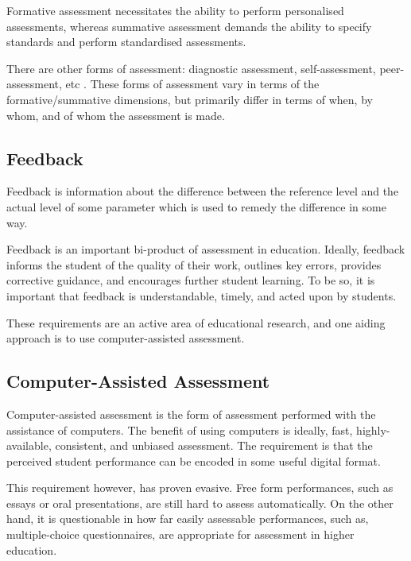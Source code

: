 Formative assessment necessitates the ability to perform personalised
assessments, whereas summative assessment demands the ability to specify
standards and perform standardised assessments.

There are other forms of assessment: diagnostic assessment, self-assessment,
peer-assessment, etc \cite{bull-mckenna-2004,topping-1998}.  These forms of
assessment vary in terms of the formative/summative dimensions, but primarily
differ in terms of when, by whom, and of whom the assessment is made.

\subsection{Feedback}

Feedback is information about the difference between the reference level and
the actual level of some parameter which is used to remedy the difference in
some way\cite{ramaprasad1989}.

Feedback is an important bi-product of assessment in
education\cite{black-william-1998}. Ideally, feedback informs the student of
the quality of their work, outlines key errors, provides corrective guidance,
and encourages further student learning. To be so, it is important that
feedback is understandable, timely, and acted upon by
students\cite{gibbs-simpson-2004}.

These requirements are an active area of educational research, and one aiding
approach is to use computer-assisted assessment.

\subsection{Computer-Assisted Assessment}

Computer-assisted assessment is the form of assessment performed with the
assistance of computers\cite{conole-warburton-2005}. The benefit of using
computers is ideally, fast, highly-available, consistent, and unbiased
assessment\cite{ala-mutka-2005}. The requirement is that the perceived student
performance can be encoded in some useful digital format.

This requirement however, has proven evasive. Free form performances, such as
essays or oral presentations, are still hard to assess
automatically\cite{valenti-et-al-2003}.  On the other hand, it is questionable
in how far easily assessable performances, such as, multiple-choice
questionnaires, are appropriate for assessment in higher
education\cite{conole-warburton-2005}.

